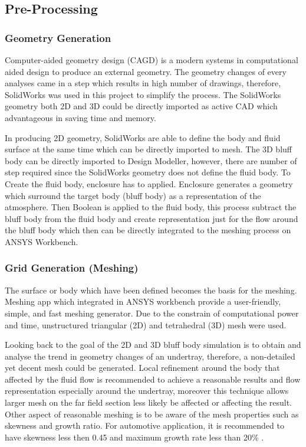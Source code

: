 \subsection{Pre-Processing}
\subsubsection{Geometry Generation}
Computer-aided geometry design (CAGD) is a modern systems in computational aided design to produce an external geometry\cite{Cummings2015AppliedAerodynamics}. The geometry changes of every analyses came in a step which results in high number of drawings, therefore, SolidWorks was used in this project to simplify the process. The SolidWorks geometry both 2D and 3D could be directly imported as active CAD which advantageous in saving time and memory.

In producing 2D geometry, SolidWorks are able to define the body and fluid surface at the same time which can be directly imported to mesh. The 3D bluff body can be directly imported to Design Modeller, however, there are number of step required since the SolidWorks geometry does not define the fluid body. To Create the fluid body, enclosure has to applied. Enclosure generates a geometry which surround the target body (bluff body) as a representation of the atmosphere. Then Boolean is applied to the fluid body, this process subtract the bluff body from the fluid body and create representation just for the flow around the bluff body which then  can be directly integrated to the meshing process on ANSYS Workbench.

\subsubsection{Grid Generation (Meshing)}
The surface or body which have been defined becomes the basis for the meshing. Meshing app which integrated in ANSYS workbench provide a user-friendly, simple, and fast meshing generator. Due to the constrain of computational power and time, unstructured triangular (2D) and tetrahedral (3D) mesh were used. 

\noindent Looking back to the goal of the 2D and 3D bluff body simulation is to obtain and analyse the trend in geometry changes of an undertray, therefore, a non-detailed yet decent mesh could be generated. Local refinement around the body that affected by the fluid flow is recommended \cite{Lanfrit2005BestFLUENT} to achieve a reasonable results and flow representation especially around the undertray, moreover this technique allows larger mesh on the far field section less likely be affected or affecting the result. Other aspect of reasonable meshing is to be aware of the mesh properties such as skewness and growth ratio. For automotive application, it is recommended to have skewness less then 0.45 and maximum growth rate less than 20\% \cite{Lanfrit2005BestFLUENT}. 

